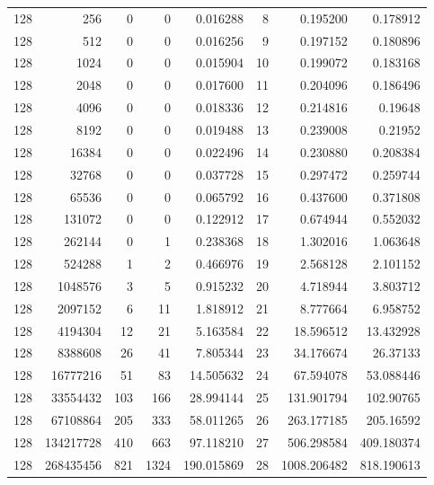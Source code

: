 \begin{longtable}[c]{@{}rrrrrrrr@{}}
    128       & 256       & 0         & 0        & 0.016288    & 8                   & 0.195200    & 0.178912   \\
    128       & 512       & 0         & 0        & 0.016256    & 9                   & 0.197152    & 0.180896   \\
    128       & 1024      & 0         & 0        & 0.015904    & 10                  & 0.199072    & 0.183168   \\
    128       & 2048      & 0         & 0        & 0.017600    & 11                  & 0.204096    & 0.186496   \\
    128       & 4096      & 0         & 0        & 0.018336    & 12                  & 0.214816    & 0.19648    \\
    128       & 8192      & 0         & 0        & 0.019488    & 13                  & 0.239008    & 0.21952    \\
    128       & 16384     & 0         & 0        & 0.022496    & 14                  & 0.230880    & 0.208384   \\
    128       & 32768     & 0         & 0        & 0.037728    & 15                  & 0.297472    & 0.259744   \\
    128       & 65536     & 0         & 0        & 0.065792    & 16                  & 0.437600    & 0.371808   \\
    128       & 131072    & 0         & 0        & 0.122912    & 17                  & 0.674944    & 0.552032   \\
    128       & 262144    & 0         & 1        & 0.238368    & 18                  & 1.302016    & 1.063648   \\
    128       & 524288    & 1         & 2        & 0.466976    & 19                  & 2.568128    & 2.101152   \\
    128       & 1048576   & 3         & 5        & 0.915232    & 20                  & 4.718944    & 3.803712   \\
    128       & 2097152   & 6         & 11       & 1.818912    & 21                  & 8.777664    & 6.958752   \\
    128       & 4194304   & 12        & 21       & 5.163584    & 22                  & 18.596512   & 13.432928  \\
    128       & 8388608   & 26        & 41       & 7.805344    & 23                  & 34.176674   & 26.37133   \\
    128       & 16777216  & 51        & 83       & 14.505632   & 24                  & 67.594078   & 53.088446  \\
    128       & 33554432  & 103       & 166      & 28.994144   & 25                  & 131.901794  & 102.90765  \\
    128       & 67108864  & 205       & 333      & 58.011265   & 26                  & 263.177185  & 205.16592  \\
    128       & 134217728 & 410       & 663      & 97.118210   & 27                  & 506.298584  & 409.180374 \\
    128       & 268435456 & 821       & 1324     & 190.015869  & 28                  & 1008.206482 & 818.190613 \\* \bottomrule
    \end{longtable}